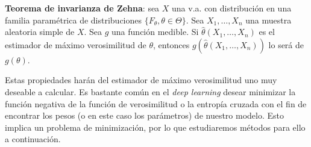 \begin{theorem}
    \textbf{Teorema de invarianza de Zehna}: sea $X$ una \ac{v.a.} con distribución en una familia paramétrica de distribuciones $\{F_\theta, \theta \in \Theta \}$. Sea $X_1, \ldots, X_n$ una muestra aleatoria simple de $X$. Sea $g$ una función medible. Si $\hat{\theta}(X_1, \ldots, X_n)$ es el estimador de máximo verosimilitud de $\theta$, entonces $g(\hat{\theta}(X_1, \ldots, X_n))$ lo será de $g(\theta)$.
\end{theorem}
Estas propiedades harán del estimador de máximo verosimilitud uno muy deseable a calcular. Es bastante común en el \textit{deep learning} desear minimizar la función negativa de la función de verosimilitud o la entropía cruzada con el fin de encontrar los pesos (o en este caso los parámetros) de nuestro modelo. Esto implica un problema de minimización, por lo que estudiaremos métodos para ello a continuación.